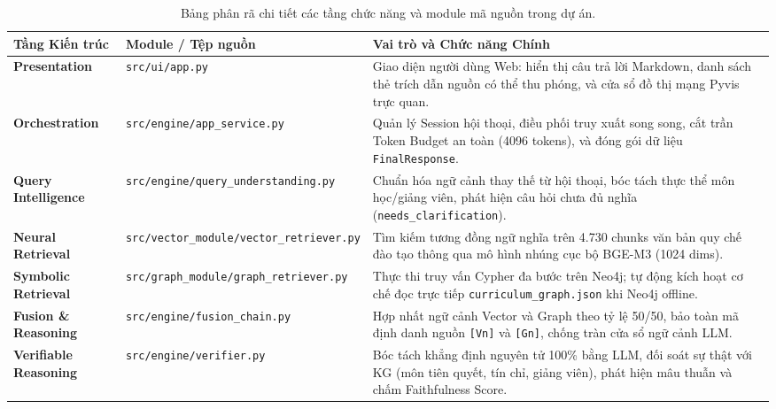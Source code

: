 \documentclass[a4paper,12pt]{article}
\begin{document}
\begin{table}[htbp]
\centering
\small
\begin{tabularx}{\textwidth}{l p{4.2cm} X}
\toprule
\textbf{Tầng Kiến trúc} & \textbf{Module / Tệp nguồn} & \textbf{Vai trò và Chức năng Chính} \\
\midrule
\textbf{Presentation} & \texttt{src/ui/app.py} & Giao diện người dùng Web: hiển thị câu trả lời Markdown, danh sách thẻ trích dẫn nguồn có thể thu phóng, và cửa sổ đồ thị mạng Pyvis trực quan. \\
\addlinespace
\textbf{Orchestration} & \texttt{src/engine/app\_service.py} & Quản lý Session hội thoại, điều phối truy xuất song song, cắt trần Token Budget an toàn (4096 tokens), và đóng gói dữ liệu \texttt{FinalResponse}. \\
\addlinespace
\textbf{Query Intelligence} & \texttt{src/engine/query\_understanding.py} & Chuẩn hóa ngữ cảnh thay thế từ hội thoại, bóc tách thực thể môn học/giảng viên, phát hiện câu hỏi chưa đủ nghĩa (\texttt{needs\_clarification}). \\
\addlinespace
\textbf{Neural Retrieval} & \texttt{src/vector\_module/vector\_retriever.py} & Tìm kiếm tương đồng ngữ nghĩa trên 4.730 chunks văn bản quy chế đào tạo thông qua mô hình nhúng cục bộ BGE-M3 (1024 dims). \\
\addlinespace
\textbf{Symbolic Retrieval} & \texttt{src/graph_module/graph\_retriever.py} & Thực thi truy vấn Cypher đa bước trên Neo4j; tự động kích hoạt cơ chế đọc trực tiếp \texttt{curriculum\_graph.json} khi Neo4j offline. \\
\addlinespace
\textbf{Fusion \& Reasoning} & \texttt{src/engine/fusion\_chain.py} & Hợp nhất ngữ cảnh Vector và Graph theo tỷ lệ 50/50, bảo toàn mã định danh nguồn \texttt{[Vn]} và \texttt{[Gn]}, chống tràn cửa sổ ngữ cảnh LLM. \\
\addlinespace
\textbf{Verifiable Reasoning} & \texttt{src/engine/verifier.py} & Bóc tách khẳng định nguyên tử 100\% bằng LLM, đối soát sự thật với KG (môn tiên quyết, tín chỉ, giảng viên), phát hiện mâu thuẫn và chấm Faithfulness Score. \\
\bottomrule
\end{tabularx}
\caption{Bảng phân rã chi tiết các tầng chức năng và module mã nguồn trong dự án.}
\label{tab:components}
\end{table}

\end{document}
